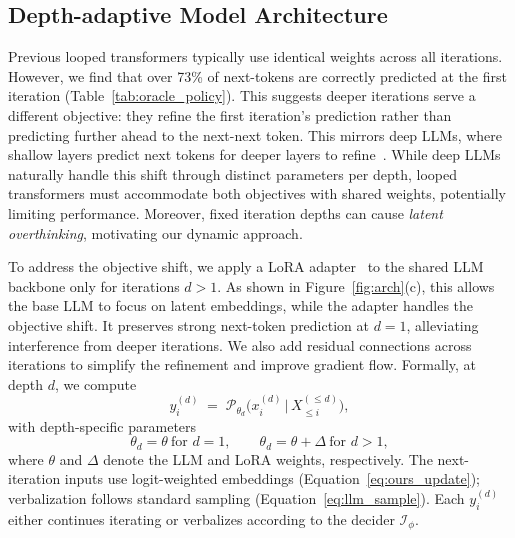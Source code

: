 

\subsection{Depth-adaptive Model Architecture}
\label{sec:model_architecture}

Previous looped transformers typically use identical weights across all iterations.
However, we find that over 73\% of next-tokens are correctly predicted at the first iteration (Table~\ref{tab:oracle_policy}).
This suggests deeper iterations serve a different objective: they refine the first iteration's prediction rather than predicting further ahead to the next-next token.
This mirrors deep LLMs, where shallow layers predict next tokens for deeper layers to refine~\citep{belrose2023tunedLens, schuster2022confidentEarlyExit, bae2023fastEarlyExit}.
While deep LLMs naturally handle this shift through distinct parameters per depth, looped transformers must accommodate both objectives with shared weights, potentially limiting performance.
Moreover, fixed iteration depths can cause \emph{latent overthinking}, motivating our dynamic approach.

To address the objective shift, we apply a LoRA adapter~\citep{hu2022lora} to the shared LLM backbone only for iterations $d>1$.
As shown in Figure~\ref{fig:arch}(c), this allows the base LLM to focus on latent embeddings, while the adapter handles the objective shift.
It preserves strong next-token prediction at $d=1$, alleviating interference from deeper iterations.
We also add residual connections across iterations to simplify the refinement and improve gradient flow.
Formally, at depth $d$, we compute
\begin{equation}
    y_i^{(d)} \;=\; \mathcal{P}_{\theta_d}\!\Big(x_i^{(d)} \,\Big|\, X_{\le i}^{(\le d)}\Big),
    \label{eq:ours_decode}
\end{equation}
with depth-specific parameters
\[
\theta_d=\theta \ \text{for } d=1,
\qquad
\theta_d=\theta+\Delta \ \text{for } d > 1,
\]
where $\theta$ and $\Delta$ denote the LLM and LoRA weights, respectively.
The next-iteration inputs use logit-weighted embeddings (Equation~\ref{eq:ours_update}); verbalization follows standard sampling (Equation~\ref{eq:llm_sample}).
Each $y_i^{(d)}$ either continues iterating or verbalizes according to the decider $\mathcal{I}_\phi$.

